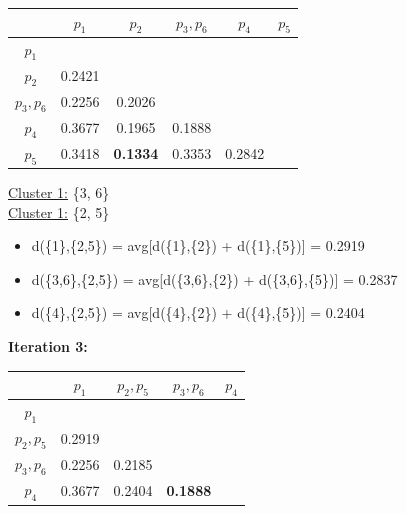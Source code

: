 \documentclass[11pt]{article}
\begin{document}
	\begin{center}
    	\begin{adjustbox}{max width=\textwidth}
		\begin{tabular}{ | c | c | c | c | c | c |}
	  	 	\hline

	  	 	& \textbf{$p_1$} & \textbf{$p_2$} & \textbf{$p_3, p_6$} & \textbf{$p_4$} & \textbf{$p_5$}\\
	  	 	\hline
	  	 	
	  	 	\textbf{$p_1$} &  &  &  &  &\\
	  	 	\hline
	  	 	
	  	 	\textbf{$p_2$} & 0.2421 &  &  &  &\\
	  	 	\hline
	  	 	
	  	 	\textbf{$p_3, p_6$} & 0.2256 & 0.2026 &  &  &\\
	  	 	\hline
	  	 	
	  	 	\textbf{$p_4$} & 0.3677 & 0.1965 & 0.1888 &  &\\
	  	 	\hline
	  	 	
	  	 	\textbf{$p_5$} & 0.3418 & \textbf{0.1334} & 0.3353 & 0.2842 &\\
	  	 	\hline			
    		\end{tabular}
    	\end{adjustbox}
	\end{center}
	
	\underline{Cluster 1:} \{3, 6\} \\
	\underline{Cluster 1:} \{2, 5\} \\
	
	\begin{itemize}
		\item d(\{1\},\{2,5\}) = avg[d(\{1\},\{2\}) + d(\{1\},\{5\})] = 0.2919
		\item d(\{3,6\},\{2,5\}) = avg[d(\{3,6\},\{2\}) + d(\{3,6\},\{5\})] = 0.2837
		\item d(\{4\},\{2,5\}) = avg[d(\{4\},\{2\}) + d(\{4\},\{5\})] = 0.2404
	\end{itemize}


	\textbf{Iteration 3:}
	
	\begin{center}
    	\begin{adjustbox}{max width=\textwidth}
		\begin{tabular}{ | c | c | c | c | c |}
	  	 	\hline

	  	 	& \textbf{$p_1$} & \textbf{$p_2, p_5$} & \textbf{$p_3, p_6$} & \textbf{$p_4$}\\
	  	 	\hline
	  	 	
	  	 	\textbf{$p_1$} &  &  &  &\\
	  	 	\hline
	  	 	
	  	 	\textbf{$p_2, p_5$} & 0.2919 &  &  &\\
	  	 	\hline
	  	 	
	  	 	\textbf{$p_3, p_6$} & 0.2256 & 0.2185 &  &\\
	  	 	\hline
	  	 	
	  	 	\textbf{$p_4$} & 0.3677 & 0.2404 & \textbf{0.1888} &\\
	  	 	\hline		
    		\end{tabular}
    	\end{adjustbox}
	\end{center}
	
\end{document}
